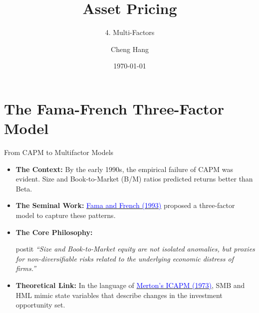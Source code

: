 \documentclass{beamer}
\title[Asset Pricing]{\textbf{Asset Pricing}} %
\subtitle{4. Multi-Factors}
\author[Cheng Hang]{Cheng Hang} %
\institute[DUFE] %
{School of Fintech \\
	Dongbei University of Finance \& Economics \\ %
	\medskip
	\textbf{chenghangch@qq.com}%
}
\date{\today} %
\begin{document}
\begin{frame}
	\titlepage %
\end{frame}
\section{The Fama-French Three-Factor Model}

\begin{frame}{From CAPM to Multifactor Models}
	\begin{itemize}
		\item \textbf{The Context:} By the early 1990s, the empirical failure of CAPM was evident. Size and Book-to-Market (B/M) ratios predicted returns better than Beta.
		\item \textbf{The Seminal Work:} \href{https://www.sciencedirect.com/science/article/pii/0304405X93900235}{\textcolor{blue}{Fama and French (1993)}} proposed a three-factor model to capture these patterns.
		\item \textbf{The Core Philosophy:}\\
		\begin{beamercolorbox}[sep=0em,wd=\linewidth,rounded=true,shadow=true]{postit}
        \textit{``Size and Book-to-Market equity are not isolated anomalies, but proxies for non-diversifiable risks related to the underlying economic distress of firms.''}
    \end{beamercolorbox}
		\item \textbf{Theoretical Link:} In the language of \href{https://doi.org/10.2307/1913811}{\textcolor{blue}{Merton's ICAPM (1973)}}, SMB and HML mimic state variables that describe changes in the investment opportunity set.
	\end{itemize}
\end{frame}
\end{document}
